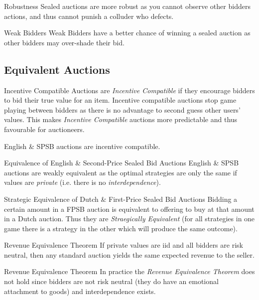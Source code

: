 \documentclass[11pt,a4paper]{article}
\begin{document}
\begin{remark}{Robustness}
  Sealed auctions are more robust as you cannot observe other bidders actions, and thus cannot punish a colluder who defects.
\end{remark}

\begin{remark}{Weak Bidders}
  Weak Bidders have a better chance of winning a sealed auction as other bidders may over-shade their bid.
\end{remark}

\subsection{Equivalent Auctions}

\begin{definition}{Incentive Compatible}
  Auctions are \textit{Incentive Compatible} if they encourage bidders to bid their true value for an item. Incentive compatible auctions stop game playing between bidders as there is no advantage to second guess other users' values. This makes \textit{Incentive Compatible} auctions more predictable and thus favourable for auctioneers.
  \par English \& SPSB auctions are incentive compatible.
\end{definition}

\begin{remark}{Equivalence of English \& Second-Price Sealed Bid Auctions}
  English \& SPSB auctions are weakly equivalent as the optimal strategies are only the same if values are \textit{private} (i.e. there is no \textit{interdependence}).
\end{remark}

\begin{remark}{Strategic Equivalence of Dutch \& First-Price Sealed Bid Auctions}
  Bidding a certain amount in a FPSB auction is equivalent to offering to buy at that amount in a Dutch auction. Thus they are \textit{Straegically Equivalent} (for all strategies in one game there is a strategy in the other which will produce the same outcome).
\end{remark}

\begin{theorem}{Revenue Equivalence Theorem}
  If private values are iid and all bidders are risk neutral, then any standard auction yields the same expected revenue to the seller.
\end{theorem}

\begin{remark}{Revenue Equivalence Theorem}
  In practice the \textit{Revenue Equivalence Theorem} does not hold since bidders are not risk neutral (they do have an emotional attachment to goods) and interdependence exists.
\end{remark}
\end{document}
